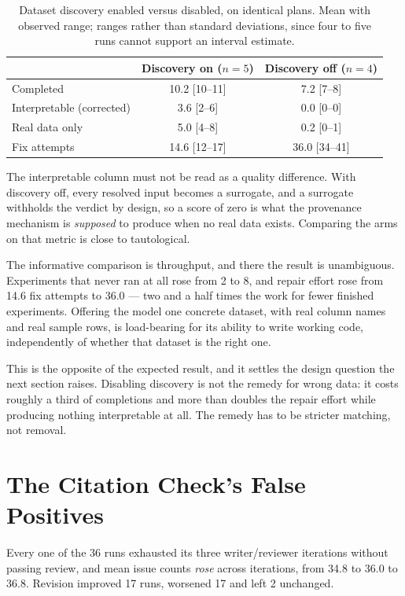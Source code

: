 \begin{table}[htbp]
\centering\small
\caption{Dataset discovery enabled versus disabled, on identical plans.
Mean with observed range; ranges rather than standard deviations, since four to
five runs cannot support an interval estimate.}
\label{tab:ablation}
\begin{tabularx}{\textwidth}{Xcc}
\toprule
& \textbf{Discovery on} ($n{=}5$) & \textbf{Discovery off} ($n{=}4$) \\
\midrule
Completed                  & 10.2 [10--11] & 7.2 [7--8] \\
Interpretable (corrected)  & 3.6 [2--6]    & 0.0 [0--0] \\
Real data only             & 5.0 [4--8]    & 0.2 [0--1] \\
Fix attempts               & 14.6 [12--17] & 36.0 [34--41] \\
\bottomrule
\end{tabularx}
\end{table}

The interpretable column must not be read as a quality difference. With discovery
off, every resolved input becomes a surrogate, and a surrogate withholds the
verdict by design, so a score of zero is what the provenance mechanism is
\emph{supposed} to produce when no real data exists. Comparing the arms on that
metric is close to tautological.

The informative comparison is throughput, and there the result is unambiguous.
Experiments that never ran at all rose from 2 to 8, and repair effort rose from
14.6 fix attempts to 36.0 --- two and a half times the work for fewer finished
experiments. Offering the model one concrete dataset, with real column names and
real sample rows, is load-bearing for its ability to write working code,
independently of whether that dataset is the right one.

This is the opposite of the expected result, and it settles the design question
the next section raises. Disabling discovery is not the remedy for wrong data: it
costs roughly a third of completions and more than doubles the repair effort while
producing nothing interpretable at all. The remedy has to be stricter matching,
not removal.


\chapter{The Citation Check's False Positives}
\label{app:citation-check}

Every one of the 36 runs exhausted its three writer/reviewer iterations without
passing review, and mean issue counts \emph{rose} across iterations, from 34.8 to
36.0 to 36.8. Revision improved 17 runs, worsened 17 and left 2 unchanged.


